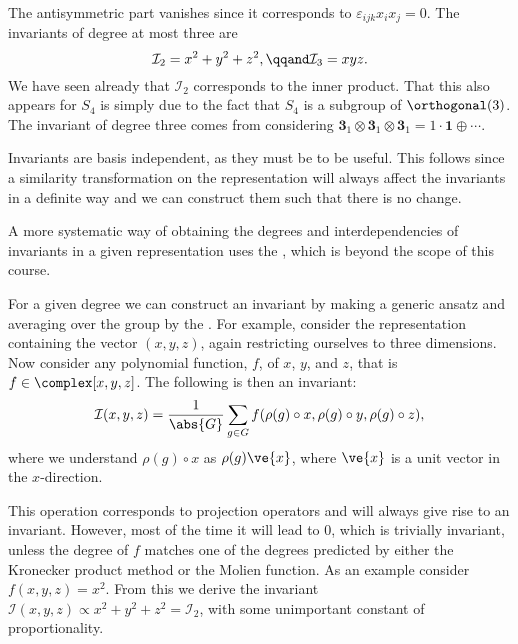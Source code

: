 \documentclass[fleqn]{NotesClass}
\newcommand*{\directsum}{\oplus}
\newcommand*{\directproduct}{\otimes}
\newcommand*{\rep}[1]{\mathbf{#1}}
\begin{document}
    The antisymmetric part vanishes since it corresponds to \(\varepsilon_{ijk}x_ix_j = 0\).
    The invariants of degree at most three are
    \begin{equation}
        \mathcal{I}_2 = x^2 + y^2 + z^2, \qqand \mathcal{I}_3 = xyz.
    \end{equation}
    We have seen already that \(\mathcal{I}_2\) corresponds to the inner product.
    That this also appears for \(S_4\) is simply due to the fact that \(S_4\) is a subgroup of \(\orthogonal(3)\).
    The invariant of degree three comes from considering \(\rep{3}_1 \directproduct \rep{3}_1 \directproduct \rep{3}_1 = 1\cdot \rep{1} \directsum \dotsb\).
    
    Invariants are basis independent, as they must be to be useful.
    This follows since a similarity transformation on the representation will always affect the invariants in a definite way and we can construct them such that there is no change.
    
    A more systematic way of obtaining the degrees and interdependencies of invariants in a given representation uses the , which is beyond the scope of this course.
    
    For a given degree we can construct an invariant by making a generic ansatz and averaging over the group by the .
    For example, consider the representation containing the vector \((x, y, z)\), again restricting ourselves to three dimensions.
    Now consider any polynomial function, \(f\), of \(x\), \(y\), and \(z\), that is \(f \in \complex[x, y, z]\).
    The following is then an invariant:
    \begin{equation}
        \mathcal{I}(x, y, z) = \frac{1}{\abs{G}} \sum_{g \in G} f(\rho(g) \circ x, \rho(g) \circ y, \rho(g) \circ z),
    \end{equation}
    where we understand \(\rho(g)\circ x\) as \(\rho(g)\ve{x}\), where \(\ve{x}\) is a unit vector in the \(x\)-direction.
    
    This operation corresponds to projection operators and will always give rise to an invariant.
    However, most of the time it will lead to 0, which is trivially invariant, unless the degree of \(f\) matches one of the degrees predicted by either the Kronecker product method or the Molien function.
    As an example consider \(f(x, y, z) = x^2\).
    From this we derive the invariant \(\mathcal{I}(x, y, z) \propto x^2 + y^2 + z^2 = \mathcal{I}_2\), with some unimportant constant of proportionality.
    
\end{document}
